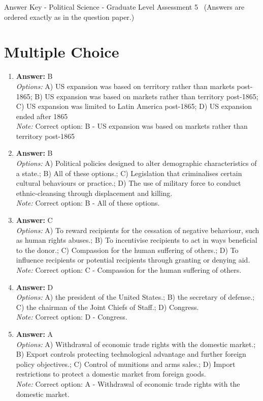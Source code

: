 \documentclass[12pt]{article}
\begin{document}
\begin{center}
Answer Key - Political Science - Graduate Level Assessment 5 \
\small (Answers are ordered exactly as in the question paper.)
\end{center}

\section*{Multiple Choice}
\begin{enumerate}[label=\arabic*.]
\item \textbf{Answer:} B
\\ \textit{Options:} A) US expansion was based on territory rather than markets post-1865; B) US expansion was based on markets rather than territory post-1865; C) US expansion was limited to Latin America post-1865; D) US expansion ended after 1865
\\ \textit{Note:} Correct option: B - US expansion was based on markets rather than territory post-1865
\item \textbf{Answer:} B
\\ \textit{Options:} A) Political policies designed to alter demographic characteristics of a state.; B) All of these options.; C) Legislation that criminalises certain cultural behaviours or practice.; D) The use of military force to conduct ethnic-cleansing through displacement and killing.
\\ \textit{Note:} Correct option: B - All of these options.
\item \textbf{Answer:} C
\\ \textit{Options:} A) To reward recipients for the cessation of negative behaviour, such as human rights abuses.; B) To incentivise recipients to act in ways beneficial to the donor.; C) Compassion for the human suffering of others.; D) To influence recipients or potential recipients through granting or denying aid.
\\ \textit{Note:} Correct option: C - Compassion for the human suffering of others.
\item \textbf{Answer:} D
\\ \textit{Options:} A) the president of the United States.; B) the secretary of defense.; C) the chairman of the Joint Chiefs of Staff.; D) Congress.
\\ \textit{Note:} Correct option: D - Congress.
\item \textbf{Answer:} A
\\ \textit{Options:} A) Withdrawal of economic trade rights with the domestic market.; B) Export controls protecting technological advantage and further foreign policy objectives.; C) Control of munitions and arms sales.; D) Import restrictions to protect a domestic market from foreign goods.
\\ \textit{Note:} Correct option: A - Withdrawal of economic trade rights with the domestic market.
\end{enumerate}
\end{document}
